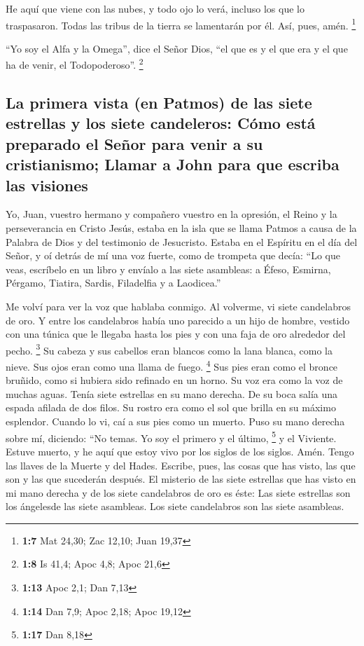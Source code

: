  He aquí que viene con las nubes, y todo ojo lo verá,
incluso los que lo traspasaron. Todas las tribus de la tierra se
lamentarán por él. Así, pues, amén. \footnote{\textbf{1:7} Mat 24,30;
  Zac 12,10; Juan 19,37}

 ``Yo soy el Alfa y la Omega'', dice el Señor Dios, ``el
que es y el que era y el que ha de venir, el Todopoderoso''. \footnote{\textbf{1:8}
  Is 41,4; Apoc 4,8; Apoc 21,6}

\hypertarget{la-primera-vista-en-patmos-de-las-siete-estrellas-y-los-siete-candeleros-cuxf3mo-estuxe1-preparado-el-seuxf1or-para-venir-a-su-cristianismo-llamar-a-john-para-que-escriba-las-visiones}{%
\subsection{La primera vista (en Patmos) de las siete estrellas y los
siete candeleros: Cómo está preparado el Señor para venir a su
cristianismo; Llamar a John para que escriba las
visiones}\label{la-primera-vista-en-patmos-de-las-siete-estrellas-y-los-siete-candeleros-cuxf3mo-estuxe1-preparado-el-seuxf1or-para-venir-a-su-cristianismo-llamar-a-john-para-que-escriba-las-visiones}}

 Yo, Juan, vuestro hermano y compañero vuestro en la
opresión, el Reino y la perseverancia en Cristo Jesús, estaba en la isla
que se llama Patmos a causa de la Palabra de Dios y del testimonio de
Jesucristo.  Estaba en el Espíritu en el día del Señor, y
oí detrás de mí una voz fuerte, como de trompeta  que
decía: ``Lo que veas, escríbelo en un libro y envíalo a las siete
asambleas: a Éfeso, Esmirna, Pérgamo, Tiatira, Sardis, Filadelfia y a
Laodicea.''

 Me volví para ver la voz que hablaba conmigo. Al
volverme, vi siete candelabros de oro.  Y entre los
candelabros había uno parecido a un hijo de hombre, vestido con una
túnica que le llegaba hasta los pies y con una faja de oro alrededor del
pecho. \footnote{\textbf{1:13} Apoc 2,1; Dan 7,13}  Su
cabeza y sus cabellos eran blancos como la lana blanca, como la nieve.
Sus ojos eran como una llama de fuego. \footnote{\textbf{1:14} Dan 7,9;
  Apoc 2,18; Apoc 19,12}  Sus pies eran como el bronce
bruñido, como si hubiera sido refinado en un horno. Su voz era como la
voz de muchas aguas.  Tenía siete estrellas en su mano
derecha. De su boca salía una espada afilada de dos filos. Su rostro era
como el sol que brilla en su máximo esplendor.  Cuando lo
vi, caí a sus pies como un muerto. Puso su mano derecha sobre mí,
diciendo: ``No temas. Yo soy el primero y el último, \footnote{\textbf{1:17}
  Dan 8,18}  y el Viviente. Estuve muerto, y he aquí que
estoy vivo por los siglos de los siglos. Amén. Tengo las llaves de la
Muerte y del Hades.  Escribe, pues, las cosas que has
visto, las que son y las que sucederán después.  El
misterio de las siete estrellas que has visto en mi mano derecha y de
los siete candelabros de oro es éste: Las siete estrellas son los
ángelesde las siete asambleas. Los siete candelabros son las siete
asambleas.

